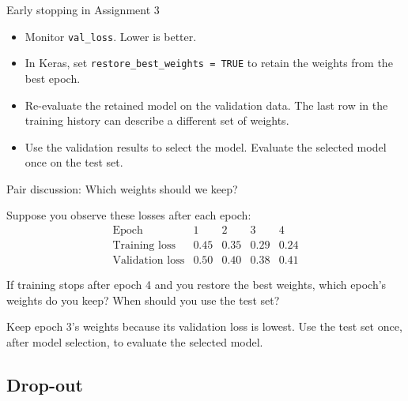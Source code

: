 \documentclass[10pt]{beamer}
\begin{document}
\begin{frame}{Early stopping in Assignment 3}
\begin{itemize}
\item Monitor \texttt{val\_loss}. Lower is better.
\item In Keras, set \texttt{restore\_best\_weights = TRUE} to retain the weights from the best epoch.
\item Re-evaluate the retained model on the validation data. The last row in the training history can describe a different set of weights.
\item Use the validation results to select the model. Evaluate the selected model once on the test set.
\end{itemize}
\end{frame}

\begin{frame}{Pair discussion: Which weights should we keep?}


Suppose you observe these losses after each epoch:
\[
\begin{array}{c|cccc}
\text{Epoch} & 1 & 2 & 3 & 4\\ \hline
\text{Training loss} & 0.45 & 0.35 & 0.29 & 0.24\\
\text{Validation loss} & 0.50 & 0.40 & 0.38 & 0.41
\end{array}
\]

If training stops after epoch 4 and you restore the best weights,
which epoch's weights do you keep? When should you use the test set?

\pause
Keep epoch 3's weights because its validation loss is lowest.
Use the test set once, after model selection, to evaluate the selected model.

\end{frame}

\subsection{Drop-out}

\end{document}
